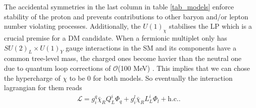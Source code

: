 The accidental symmetries in the last column in table \ref{tab_models}
enforce stability of the proton and prevents contributions to other baryon and/or lepton number violating
processes. Additionally, the $U(1)_\chi$ stabilises the LP which is a crucial premise for a DM candidate. 
When a fermionic multiplet only has $SU(2)_L\times U(1)_Y$ gauge interactions in the SM and its components have a common tree-level mass, the charged 
ones become havier than the neutral one due to quantum loop corrections of $\mathcal{O}$(100 MeV) \cite{Hisano}\cite{minMatter}. This implies that we 
can chose the hypercharge of $\chi$ to be 0 for both models. So eventually the interaction lagrangian for them reads
\begin{align}
 \mathcal{L} = g_i^q \bar \chi_R Q_L^i \Phi_q + g_i^l \bar \chi_R L_L^i \Phi_l + \text{h.c.}.
\end{align}
